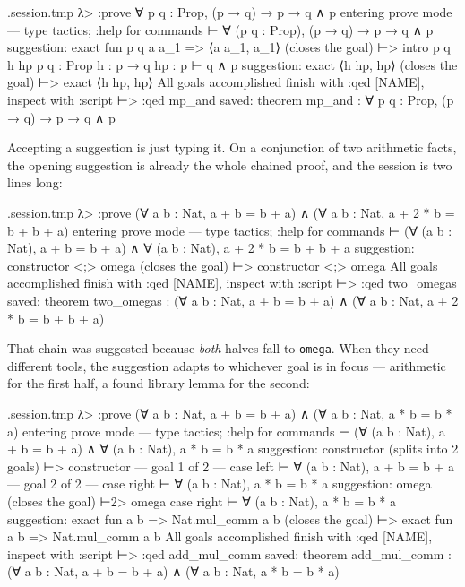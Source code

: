 \documentclass[11pt,oneside]{article}
\newcommand{\code}[1]{\texttt{#1}}
\newenvironment{session}
 {\VerbatimEnvironment\begin{VerbatimOut}{\jobname.session.tmp}}
 {\end{VerbatimOut}%
  \begin{sessionouter}%
  \VerbatimInput[fontsize=\footnotesize, breaklines=true,
    breaksymbolleft={\textcolor{stone}{\footnotesize$\hookrightarrow$}},
    formatcom=\color{ink}, tabsize=4]{\jobname.session.tmp}%
  \end{sessionouter}}
\begin{document}
\begin{session}
λ> :prove ∀ p q : Prop, (p → q) → p → q ∧ p
entering prove mode — type tactics; :help for commands
⊢ ∀ (p q : Prop), (p → q) → p → q ∧ p
suggestion: exact fun p q a a_1 => ⟨a a_1, a_1⟩  (closes the goal)
⊢> intro p q h hp
p q : Prop
h : p → q
hp : p
⊢ q ∧ p
suggestion: exact ⟨h hp, hp⟩  (closes the goal)
⊢> exact ⟨h hp, hp⟩
All goals accomplished
finish with :qed [NAME], inspect with :script
⊢> :qed mp_and
saved: theorem mp_and : ∀ p q : Prop, (p → q) → p → q ∧ p
\end{session}

Accepting a suggestion is just typing it.  On a conjunction of two
arithmetic facts, the opening suggestion is already the whole chained
proof, and the session is two lines long:

\begin{session}
λ> :prove (∀ a b : Nat, a + b = b + a) ∧ (∀ a b : Nat, a + 2 * b = b + b + a)
entering prove mode — type tactics; :help for commands
⊢ (∀ (a b : Nat), a + b = b + a) ∧ ∀ (a b : Nat), a + 2 * b = b + b + a
suggestion: constructor <;> omega  (closes the goal)
⊢> constructor <;> omega
All goals accomplished
finish with :qed [NAME], inspect with :script
⊢> :qed two_omegas
saved: theorem two_omegas : (∀ a b : Nat, a + b = b + a) ∧ (∀ a b : Nat, a + 2 * b = b + b + a)
\end{session}

That chain was suggested because \emph{both} halves fall to
\code{omega}.  When they need different tools, the suggestion adapts
to whichever goal is in focus --- arithmetic for the first half, a
found library lemma for the second:

\begin{session}
λ> :prove (∀ a b : Nat, a + b = b + a) ∧ (∀ a b : Nat, a * b = b * a)
entering prove mode — type tactics; :help for commands
⊢ (∀ (a b : Nat), a + b = b + a) ∧ ∀ (a b : Nat), a * b = b * a
suggestion: constructor  (splits into 2 goals)
⊢> constructor
— goal 1 of 2 —
case left
⊢ ∀ (a b : Nat), a + b = b + a
— goal 2 of 2 —
case right
⊢ ∀ (a b : Nat), a * b = b * a
suggestion: omega  (closes the goal)
⊢2> omega
case right
⊢ ∀ (a b : Nat), a * b = b * a
suggestion: exact fun a b => Nat.mul_comm a b  (closes the goal)
⊢> exact fun a b => Nat.mul_comm a b
All goals accomplished
finish with :qed [NAME], inspect with :script
⊢> :qed add_mul_comm
saved: theorem add_mul_comm : (∀ a b : Nat, a + b = b + a) ∧ (∀ a b : Nat, a * b = b * a)
\end{session}
\end{document}
